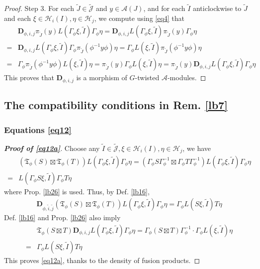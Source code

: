 \documentclass[11pt,b5paper,notitlepage]{article}
\theoremstyle{definition}
\theoremstyle{plain}
\newcommand{\fk}{\mathfrak}
\newcommand{\wtd}{\widetilde}
\newcommand{\Jtd}{\widetilde{\mathcal J}}
\newcommand{\mbf}{\mathbf}
\newcommand{\MA}{\mathcal A}
\newcommand{\MH}{\mathcal H}
\numberwithin{equation}{section}
\begin{document}
\begin{appendices}
\begin{proof}
Step 3. For each $\wtd J\in\Jtd$ and $y\in\MA(J)$, and for each $\wtd I$ anticlockwise to $\wtd J$ and each $\xi\in\MH_i(I),\eta\in\MH_j$, we compute using \eqref{eq4} that
\begin{align*}
&\mbf D_{\phi,i,j}\pi_{\wtd J}(y)L(\Gamma_\phi\xi,\wtd I)\Gamma_\phi\eta=\mbf D_{\phi,i,j}L(\Gamma_\phi\xi,\wtd I)\pi_{\wtd J}(y)\Gamma_\phi\eta\\
=&\mbf D_{\phi,i,j}L(\Gamma_\phi\xi,\wtd I)\Gamma_\phi\pi_{\wtd J}(\phi^{-1}y\phi)\eta=\Gamma_\phi L(\xi,\wtd I)\pi_{\wtd J}(\phi^{-1}y\phi)\eta\\
=&\Gamma_\phi \pi_{\wtd J}(\phi^{-1}y\phi)L(\xi,\wtd I)\eta=\pi_{\wtd J}(y)\Gamma_\phi L(\xi,\wtd I)\eta=\pi_{\wtd J}(y)\mbf D_{\phi,i,j}L(\Gamma_\phi\xi,\wtd I)\Gamma_\phi\eta
\end{align*}
This proves that $\mbf D_{\phi,i,j}$ is a morphism of $G$-twisted $\MA$-modules.
\end{proof}





\subsection{The compatibility conditions in Rem. \ref{lb7}}\label{lb25}


\subsubsection{Equations \eqref{eq12}}


\begin{proof}[\textbf{Proof of \eqref{eq12a}}]
Choose any $\wtd I\in\Jtd,\xi\in\MH_i(I),\eta\in\MH_j$, we have
\begin{align*}
&(\fk T_\phi(S)\boxtimes\fk T_\phi(T))L(\Gamma_\phi\xi,\wtd I)\Gamma_\phi\eta=(\Gamma_\phi S\Gamma_\phi^{-1}\boxtimes\Gamma_\phi T\Gamma_\phi^{-1})L(\Gamma_\phi\xi,\wtd I)\Gamma_\phi\eta\\
=&L(\Gamma_\phi S\xi,\wtd I)\Gamma_\phi T\eta
\end{align*}
where Prop. \ref{lb26} is used. Thus, by Def. \ref{lb16},
\begin{align*}
\mbf D_{\phi,\wtd i,\wtd j}(\fk T_\phi(S)\boxtimes\fk T_\phi(T))L(\Gamma_\phi\xi,\wtd I)\Gamma_\phi\eta=\Gamma_\phi L(S\xi,\wtd I)T\eta
\end{align*}
Def. \ref{lb16} and Prop. \ref{lb26} also imply
\begin{align*}
&\fk T_\phi(S\boxtimes T)\mbf D_{\phi,i,j}L(\Gamma_\phi\xi,\wtd I)\Gamma_\phi\eta=\Gamma_\phi (S\boxtimes T)\Gamma_\phi^{-1}\cdot\Gamma_\phi L(\xi,\wtd I)\eta\\
=&\Gamma_\phi L(S\xi,\wtd I)T\eta
\end{align*}
This proves \eqref{eq12a}, thanks to the density of fusion products.
\end{proof}




\end{appendices}
\end{document}
